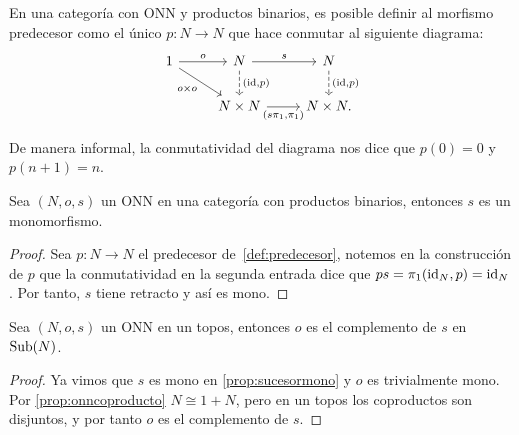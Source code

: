 \begin{definition}[label=def:predecesor]
  En una categoría con ONN y productos binarios, es posible definir al morfismo predecesor
  como el único $p\colon N\to N$ que hace conmutar al siguiente diagrama:
  \begin{equation*}
    \begin{tikzcd}
      1\ar{r}{o}\ar[swap]{rd}{o\times o} & N\ar[dashed]{d}{(\id,p)}\ar{r}{s} & N\ar[dashed]{d}{(\id,p)} \\
      & N\times N\ar[swap]{r}{(s\pi_1,\pi_1)} & N\times N.
    \end{tikzcd}
  \end{equation*}
\end{definition}

De manera informal, la conmutatividad del diagrama nos dice que $p(0)=0$ y $p(n+1)=n$.

\begin{proposition}[label=prop:sucesormono]
  Sea $(N,o,s)$ un ONN en una categoría con productos binarios, entonces $s$ es un monomorfismo.
\end{proposition}
\begin{proof}
  Sea $p\colon N\to N$ el predecesor de~\ref{def:predecesor}, notemos en la construcción de $p$ que
  la conmutatividad en la segunda entrada dice que $ps=\pi_1(\operatorname{id}_N,p)=\operatorname{id}_N$. Por tanto,
  $s$ tiene retracto y así es mono.
\end{proof}

\begin{proposition}[label=prop:complementosucesor]
  Sea $(N,o,s)$ un ONN en un topos, entonces $o$ es el complemento de $s$ en $\operatorname{Sub}(N)$.
\end{proposition}
\begin{proof}
  Ya vimos que $s$ es mono en \ref{prop:sucesormono} y $o$ es trivialmente mono. Por \ref{prop:onncoproducto}
  $N\cong 1+N$, pero en un topos los coproductos son disjuntos, y por tanto $o$ es el complemento de $s$.
\end{proof}

